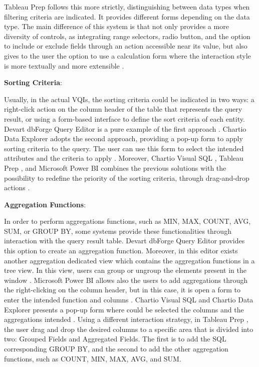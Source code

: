 Tableau Prep \cite{tableauPrep} follows this more strictly, distinguishing between data types when filtering criteria are indicated. It provides different forms depending on the data type. The main difference of this system is that not only provides a more diversity of controls, as integrating range selectors, radio button, and the option to include or exclude fields through an action accessible near its value, but also gives to the user the option to use a calculation form where the interaction style is more textually and more extensible \cite{tableauFilterYourData}.

\textbf{Sorting Criteria}: 

Usually, in the actual \glspl{VQI}, the sorting criteria could be indicated in two ways: a right-click action on the column header of the table that represents the query result, or using a form-based interface to define the sort criteria of each entity. Devart dbForge Query Editor \cite{dbForgeQueryBuilder} is a pure example of the first approach \cite{dbForgeSortingData}. Chartio Data Explorer \cite{chartioDataExplorer} adopts the second approach, providing a pop-up form to apply sorting criteria to the query. The user can use this form to select the intended attributes and the criteria to apply \cite{chartioAdvancedSorting}. Moreover, Chartio Visual SQL \cite{chartioVisualSQL}, Tableau Prep \cite{tableauPrep}, and Microsoft Power BI \cite{powerBI} combines the previous solutions with the possibility to redefine the priority of the sorting criteria, through drag-and-drop actions \cite{visualSqlActions,tableauSortData,powerBIShapeAndCombineData}.

\textbf{Aggregation Functions}: 

In order to perform aggregations functions, such as MIN, MAX, COUNT, AVG, SUM, or GROUP BY, some systems provide these functionalities through interaction with the query result table. Devart dbForge Query Editor \cite{dbForgeQueryBuilder} provides this option to create an aggregation function. Moreover, in this editor exists another aggregation dedicated view which contains the aggregation functions in a tree view. In this view, users can group or ungroup the elements present in the window \cite{dbForgeGroupingDataInGrid}. Microsoft Power BI \cite{powerBI} allows also the users to add aggregations through the right-clicking on the column header, but in this case, it is open a form to enter the intended function and columns \cite{powerBICommonQueryTasks}. Chartio Visual SQL \cite{chartioVisualSQL} and Chartio Data Explorer \cite{chartioDataExplorer} presents a pop-up form where could be selected the columns and the aggregations intended \cite{chartioDataPipelineSteps}. Using a different interaction strategy, in Tableau Prep \cite{tableauPrep}, the user drag and drop the desired columns to a specific area that is divided into two: Grouped Fields and Aggregated Fields. The first is to add the \gls{SQL} corresponding GROUP BY, and the second to add the other aggregation functions, such as COUNT, MIN, MAX, AVG, and SUM.

